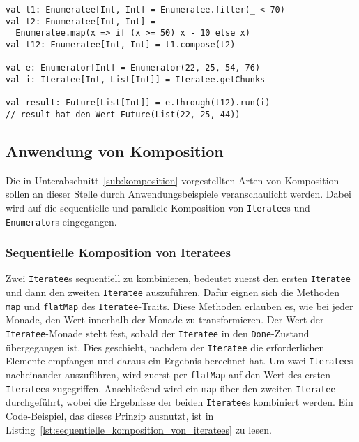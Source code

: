 \begin{lstlisting}[caption=Enumerateeanwendung auf Enumeratees, label=lst:enumerateeanwendung_auf_enumeratees]
val t1: Enumeratee[Int, Int] = Enumeratee.filter(_ < 70)
val t2: Enumeratee[Int, Int] =
  Enumeratee.map(x => if (x >= 50) x - 10 else x)
val t12: Enumeratee[Int, Int] = t1.compose(t2)

val e: Enumerator[Int] = Enumerator(22, 25, 54, 76)
val i: Iteratee[Int, List[Int]] = Iteratee.getChunks

val result: Future[List[Int]] = e.through(t12).run(i)
// result hat den Wert Future(List(22, 25, 44))
\end{lstlisting}




\subsection{Anwendung von Komposition} %
\label{sub:anwendung_komposition}

Die in Unterabschnitt~\ref{sub:komposition} vorgestellten Arten von Komposition sollen an dieser Stelle durch Anwendungsbeispiele veranschaulicht werden.
Dabei wird auf die sequentielle und parallele Komposition von \lstinline|Iteratee|s und \lstinline|Enumerator|s eingegangen.

\subsubsection{Sequentielle Komposition von Iteratees} %
\label{ssub:anwendung_sequentielle_komposition_von_iteratees}

Zwei \lstinline|Iteratee|s sequentiell zu kombinieren, bedeutet zuerst den ersten \lstinline|Iteratee| und dann den zweiten \lstinline|Iteratee| auszuführen.
Dafür eignen sich die Methoden \lstinline|map| und \lstinline|flatMap| des \lstinline|Iteratee|-Traits.
Diese Methoden erlauben es, wie bei jeder Monade, den Wert innerhalb der Monade zu transformieren.
Der Wert der \lstinline|Iteratee|-Monade steht fest, sobald der \lstinline|Iteratee| in den \lstinline|Done|-Zustand übergegangen ist.
Dies geschieht, nachdem der \lstinline|Iteratee| die erforderlichen Elemente empfangen und daraus ein Ergebnis berechnet hat.
Um zwei \lstinline|Iteratee|s nacheinander auszuführen, wird zuerst per \lstinline|flatMap| auf den Wert des ersten \lstinline|Iteratee|s zugegriffen.
Anschließend wird ein \lstinline|map| über den zweiten \lstinline|Iteratee| durchgeführt, wobei die Ergebnisse der beiden \lstinline|Iteratee|s kombiniert werden.
Ein Code-Beispiel, das dieses Prinzip ausnutzt, ist in Listing~\ref{lst:sequentielle_komposition_von_iteratees} zu lesen.

